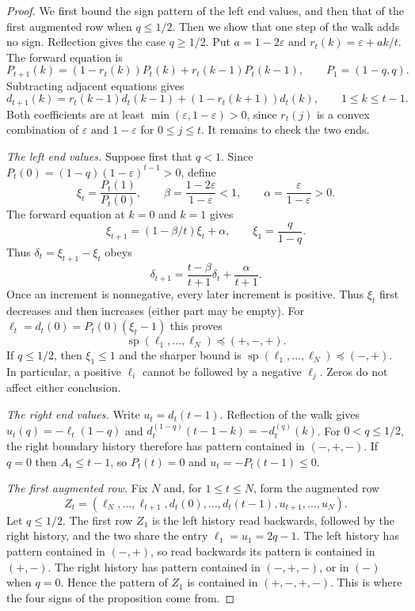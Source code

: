 \begin{proof}
We first bound the sign pattern of the left end values, and then
that of the first augmented row when $q\le1/2$. Then we show that one
step of the walk adds no sign. Reflection gives the case $q\ge1/2$.
Put $a=1-2\varepsilon$ and $r_t(k)=\varepsilon+ak/t$. The forward equation
is
\[
 P_{t+1}(k)=(1-r_t(k))P_t(k)+r_t(k-1)P_t(k-1),
 \qquad P_1=(1-q,q).
\]
Subtracting adjacent equations gives
\begin{equation}\label{eq:bias-first-diff}
 d_{t+1}(k)=r_t(k-1)d_t(k-1)+(1-r_t(k+1))d_t(k),
 \qquad 1\le k\le t-1.
\end{equation}
Both coefficients are at least $\min(\varepsilon,1-\varepsilon)>0$,
since $r_t(j)$ is a convex combination of $\varepsilon$ and
$1-\varepsilon$ for $0\le j\le t$. It remains to check the two ends.

\emph{The left end values.} Suppose first that $q<1$. Since
$P_t(0)=(1-q)(1-\varepsilon)^{t-1}>0$, define
\[
 \xi_t=\frac{P_t(1)}{P_t(0)},\qquad
 \beta=\frac{1-2\varepsilon}{1-\varepsilon}<1,\qquad
 \alpha=\frac{\varepsilon}{1-\varepsilon}>0.
\]
The forward equation at $k=0$ and $k=1$ gives
\[
 \xi_{t+1}=(1-\beta/t)\xi_t+\alpha,\qquad \xi_1=\frac q{1-q}.
\]
Thus $\delta_t=\xi_{t+1}-\xi_t$ obeys
\begin{equation}\label{eq:bias-edge-increments}
 \delta_{t+1}=\frac{t-\beta}{t+1}\delta_t+\frac\alpha{t+1}.
\end{equation}
Once an increment is nonnegative, every later increment is positive.
Thus $\xi_t$ first decreases and then increases (either part may be empty). For $\ell_t=d_t(0)=P_t(0)(\xi_t-1)$ this proves
\[
 \operatorname{sp}(\ell_1,\ldots,\ell_N)\preceq(+,-,+).
\]
If $q\le1/2$, then $\xi_1\le1$ and the sharper bound is
$\operatorname{sp}(\ell_1,\ldots,\ell_N)\preceq(-,+)$.
In particular, a positive $\ell_i$ cannot be followed by a negative
$\ell_j$. Zeros do not affect either conclusion.

\emph{The right end values.} Write $u_t=d_t(t-1)$. Reflection of the walk gives
$u_t(q)=-\ell_t(1-q)$ and
$d_t^{(1-q)}(t-1-k)=-d_t^{(q)}(k)$.
For $0<q\le1/2$, the right boundary history therefore has pattern
contained in $(-,+,-)$. If $q=0$ then $A_t\le t-1$, so $P_t(t)=0$ and
$u_t=-P_t(t-1)\le0$.

\emph{The first augmented row.} Fix $N$ and, for $1\le t\le N$, form the augmented row
\[
 Z_t=(\ell_N,\ldots,\ell_{t+1},
       d_t(0),\ldots,d_t(t-1),
       u_{t+1},\ldots,u_N).
\]
Let $q\le1/2$. The first row $Z_1$ is the left history read
backwards, followed by the right history, and the two share the entry
$\ell_1=u_1=2q-1$. The left history has pattern contained in $(-,+)$,
so read backwards its pattern is contained in $(+,-)$. The right
history has pattern contained in $(-,+,-)$, or in $(-)$ when $q=0$.
Hence the pattern of $Z_1$ is contained in $(+,-,+,-)$. This is where
the four signs of the proposition come from.


\end{proof}
